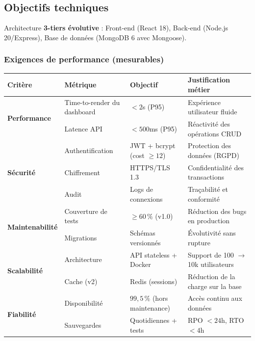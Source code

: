 \subsection{Objectifs techniques}

Architecture \textbf{3-tiers évolutive} : Front-end (React 18), Back-end (Node.js 20/Express), Base de données (MongoDB 6 avec Mongoose).

\subsubsection{Exigences de performance (mesurables)}

\begin{center}
\begin{tabular}{|l|p{3.5cm}|p{2.5cm}|p{4.5cm}|}
\hline
\textbf{Critère} & \textbf{Métrique} & \textbf{Objectif} & \textbf{Justification métier} \\
\hline
\multirow{2}{*}{\textbf{Performance}} & Time-to-render du dashboard & $< 2$s (P95) & Expérience utilisateur fluide \\
\cline{2-4}
 & Latence API & $< 500$ms (P95) & Réactivité des opérations CRUD \\
\hline
\multirow{3}{*}{\textbf{Sécurité}} & Authentification & JWT + bcrypt (cost $\geq 12$) & Protection des données (RGPD) \\
\cline{2-4}
 & Chiffrement & HTTPS/TLS 1.3 & Confidentialité des transactions \\
\cline{2-4}
 & Audit & Logs de connexions & Traçabilité et conformité \\
\hline
\multirow{2}{*}{\textbf{Maintenabilité}} & Couverture de tests & $\geq 60\,\%$ (v1.0) & Réduction des bugs en production \\
\cline{2-4}
 & Migrations & Schémas versionnés & Évolutivité sans rupture \\
\hline
\multirow{2}{*}{\textbf{Scalabilité}} & Architecture & API stateless + Docker & Support de 100 $\rightarrow$ 10k utilisateurs \\
\cline{2-4}
 & Cache (v2) & Redis (sessions) & Réduction de la charge sur la base \\
\hline
\multirow{2}{*}{\textbf{Fiabilité}} & Disponibilité & $99{,}5\,\%$ (hors maintenance) & Accès continu aux données \\
\cline{2-4}
 & Sauvegardes & Quotidiennes + tests & RPO $< 24$h, RTO $< 4$h \\
\hline
\end{tabular}
\end{center}

